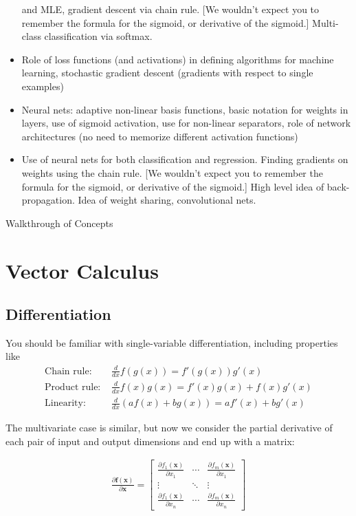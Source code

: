 \documentclass[12pt,letterpaper]{article}
\newcommand{\p}{\partial}
\newcommand{\1}{\mathbbm{1}}
\begin{document}
\begin{itemize}
and MLE, gradient descent via chain rule.  [We wouldn't expect
you to remember the formula for the sigmoid, or derivative
of the sigmoid.] Multi-class classification via softmax.
\item Role of loss functions (and activations) in defining algorithms
  for machine learning, stochastic gradient descent (gradients
  with respect to single examples)
\item Neural nets: adaptive non-linear basis functions, 
basic notation for weights in layers, use of sigmoid
activation, use for non-linear separators, role of
network architectures (no need to
memorize different activation functions)
\item Use of neural nets for both classification and regression.
Finding gradients on weights using the chain rule.
[We wouldn't expect
you to remember the formula for the sigmoid, or derivative
of the sigmoid.] High level
idea of  back-propagation. Idea of weight sharing,
convolutional nets.
%
\end{itemize}






\newpage

\begin{center}
\huge{Walkthrough of Concepts}
\end{center}

\section{Vector Calculus}

\subsection{Differentiation}
You should be familiar with single-variable differentiation, including properties like
\begin{align*}
\text{Chain rule: } & \frac{d}{d x} f(g(x))= f'(g(x))g'(x)\\
\text{Product rule: }& \frac{d}{d x} f(x)g(x) = f'(x)g(x) + f(x)g'(x)\\
\text{Linearity: }& \frac{d}{d x} (af(x) + bg(x)) = af'(x) + bg'(x)
\end{align*}

\noindent 
The multivariate case is similar, but now we consider the partial derivative of each pair of input and output dimensions and end up with a matrix:

\begin{align*}
\frac{\p \mathbf{f}(\mathbf{x})}{\p \mathbf{x}} = \begin{bmatrix}
\frac{\p f_1(\mathbf{x})}{\p x_1} & \cdots & \frac{\p f_m(\mathbf{x})}{\p x_1} \\
\vdots & \ddots & \vdots \\
\frac{\p f_1(\mathbf{x})}{\p x_n} & \cdots & \frac{\p f_m(\mathbf{x})}{\p x_n}
\end{bmatrix}
\end{align*}
\end{document}
